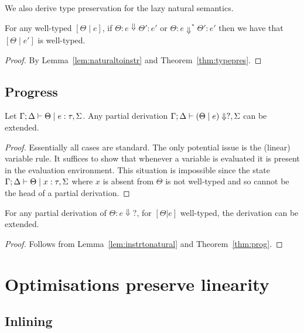 \documentclass[acmsmall,review,anonymous,screen]{acmart}
\begin{document}
We also derive type preservation for the lazy natural semantics.

  \begin{theorem}
For any well-typed $[\Theta \mid e]$, if $\Theta : e \Downarrow
\Theta' : e'$ or $\Theta : e \Downarrow^* \Theta' : e'$ then we have
that $[\Theta \mid e']$ is well-typed.
\end{theorem}
\begin{proof}
By Lemma~\ref{lem:naturaltoinstr} and Theorem~\ref{thm:typepres}.
\end{proof}

\subsection{Progress\label{sec:proof:progress}}

%

\begin{theorem}[Progress]\label{thm:prog}
Let $\Gamma ; \Delta \vdash \Theta \mid e : \tau,\Sigma$. Any partial derivation $\Gamma; \Delta \vdash (\Theta \mid e)
\Downarrow?,\Sigma$ can be extended. 
\end{theorem}

\begin{proof}
 Essentially all cases are standard. The only potential issue is the
 (linear) variable rule.
It suffices to show that whenever a variable is evaluated it is
present in the evaluation environment. This situation is impossible
since the state
$\Gamma ; \Delta \vdash \Theta \mid x : \tau , \Sigma$ where $x$ is absent
from $\Theta$ is not well-typed and so cannot be the head of a partial
derivation. 
\end{proof}

\begin{theorem}[Progress]
For any partial derivation of $\Theta : e \Downarrow?$, for $[\Theta |
e]$ well-typed, the derivation can be extended.
\end{theorem}
\begin{proof}
Follows from Lemma~\ref{lem:instrtonatural} and Theorem~\ref{thm:prog}.
 \end{proof}


\section{Optimisations preserve linearity}\label{app:optimisations}

\subsection{Inlining}

\end{document}

